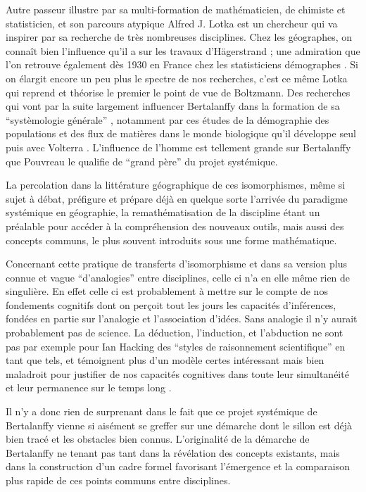 Autre passeur illustre par sa multi-formation de mathématicien, de chimiste et statisticien, et son parcours atypique Alfred J. Lotka est un chercheur qui va inspirer par sa recherche de très nombreuses disciplines. Chez les géographes, on connaît bien l'influence qu'il a sur les travaux d'Hägerstrand \autocite[95]{Claval2007}; une admiration que l'on retrouve également dès 1930 en France chez les statisticiens démographes \autocite{Veron2009}. Si on élargit encore un peu plus le spectre de nos recherches, c'est ce même Lotka qui reprend et théorise le premier le point de vue de Boltzmann. Des recherches qui vont par la suite largement influencer Bertalanffy dans la formation de sa \enquote{systèmologie générale} \autocite[178]{Pouvreau2013}, notamment par ces études de la démographie des populations et des flux de matières dans le monde biologique qu'il développe seul puis avec Volterra \autocite[545-546]{Pouvreau2013}. L'influence de l'homme est tellement grande sur Bertalanffy que Pouvreau le qualifie de \enquote{grand père} du projet systémique.

La percolation dans la littérature géographique de ces isomorphismes, même si sujet à débat, préfigure et prépare déjà en quelque sorte l'arrivée du paradigme systémique en géographie, la remathématisation de la discipline étant un préalable pour accéder à la compréhension des nouveaux outils, mais aussi des concepts communs, le plus souvent introduits sous une forme mathématique. \autocite[432]{Ackerman1963}

Concernant cette pratique de transferts d'isomorphisme et dans sa version plus connue et vague \enquote{d'analogies} entre disciplines, celle ci n'a en elle même rien de singulière. En effet celle ci est probablement à mettre sur le compte de nos fondements cognitifs dont on perçoit tout les jours les capacités d'inférences, fondées en partie sur l’analogie et l'association d'idées. Sans analogie il n'y aurait probablement pas de science. La déduction, l'induction, et l'abduction ne sont pas par exemple pour Ian Hacking des \enquote{styles de raisonnement scientifique}  en tant que tels, et témoignent plus d'un modèle certes intéressant mais bien maladroit pour justifier de nos capacités cognitives dans toute leur simultanéité et leur permanence sur le temps long \autocite[98]{Hacking1983}.

Il n'y a donc rien de surprenant dans le fait que ce projet systémique de Bertalanffy vienne si aisément se greffer sur une démarche dont le sillon est déjà bien tracé et les obstacles bien connus. L'originalité de la démarche de Bertalanffy ne tenant pas tant dans la révélation des concepts existants, mais dans la construction d'un cadre formel favorisant l'émergence et la comparaison plus rapide de ces points communs entre disciplines.

